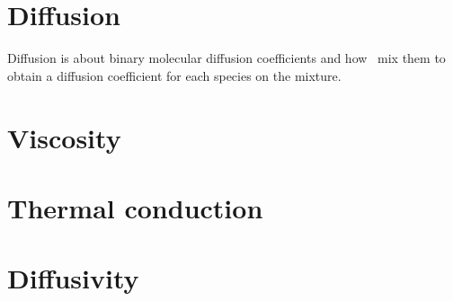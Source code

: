 \newpage
\section[transport_diffusion_graph]{Diffusion}
Diffusion is about binary molecular diffusion coefficients
and how \Antioch\ mix them to obtain a diffusion coefficient
for each species on the mixture.

\section[transport_viscosity_graph]{Viscosity}

\section[transport_therm_cond_graph]{Thermal conduction}

\section[transport_diffusivity_graph]{Diffusivity}
